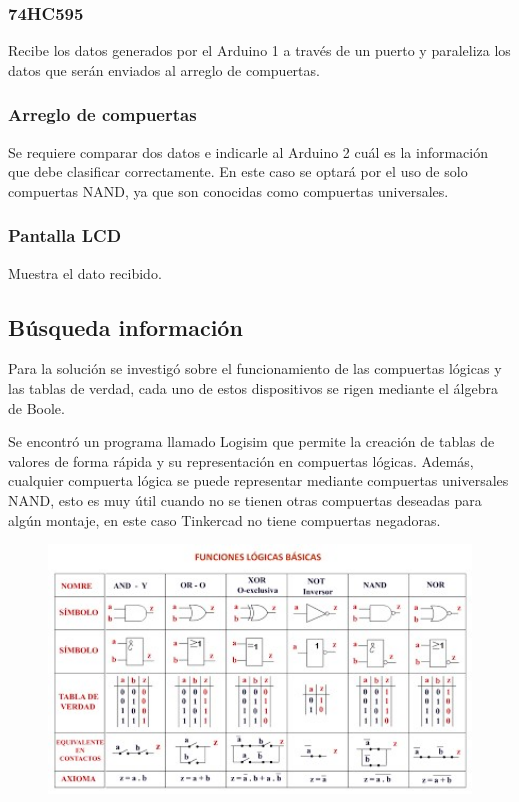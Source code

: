 \documentclass{article}
\begin{document}
\subsubsection{74HC595}
Recibe los datos generados por el Arduino 1 a través de un puerto y paraleliza los datos que serán enviados al arreglo de compuertas.

\subsubsection{Arreglo de compuertas}
Se requiere comparar dos datos e indicarle al Arduino 2 cuál es la información que debe clasificar correctamente. En este caso se optará por el uso de solo compuertas NAND, ya que son conocidas como compuertas universales.

\subsubsection{Pantalla LCD}
Muestra el dato recibido.

\newpage
\subsection{Búsqueda información}
Para la solución se investigó sobre el funcionamiento de las compuertas lógicas y las tablas de verdad, cada uno de estos dispositivos se rigen mediante el álgebra de Boole.\newline

Se encontró un programa llamado Logisim que permite la creación de tablas de valores de forma rápida y su representación en compuertas lógicas. Además, cualquier compuerta lógica se puede representar mediante compuertas universales NAND, esto es muy útil cuando no se tienen otras compuertas deseadas para algún montaje, en este caso Tinkercad no tiene compuertas negadoras. 
\begin{figure}[!ht]
\includegraphics[width=12cm]{Funciones_logicas_basicas.jpg}
\centering
\cite{Compuertas_logicas}
\end{figure}
\end{document}
